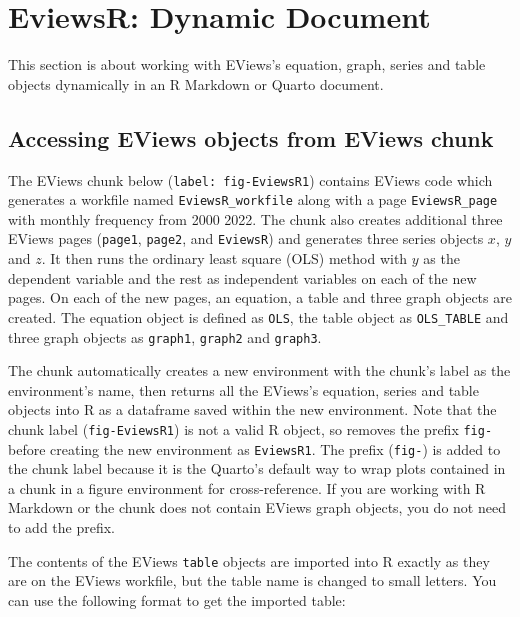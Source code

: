 \hypertarget{sec-dynamic}{%
\section{EviewsR: Dynamic Document}\label{sec-dynamic}}

This section is about working with EViews's equation, graph, series and table objects dynamically in an R Markdown or Quarto document.

\hypertarget{accessing-eviews-objects-from-eviews-chunk}{%
\subsection{Accessing EViews objects from EViews chunk}\label{accessing-eviews-objects-from-eviews-chunk}}

The EViews chunk below (\texttt{label:\ fig-EviewsR1}) contains EViews code which generates a workfile named \texttt{EviewsR\_workfile} along with a page \texttt{EviewsR\_page} with monthly frequency from 2000 2022. The chunk also creates additional three EViews pages (\texttt{page1}, \texttt{page2}, and \texttt{EviewsR}) and generates three series objects \(x\), \(y\) and \(z\). It then runs the ordinary least square (OLS) method with \(y\) as the dependent variable and the rest as independent variables on each of the new pages. On each of the new pages, an equation, a table and three graph objects are created. The equation object is defined as \texttt{OLS}, the table object as \texttt{OLS\_TABLE} and three graph objects as \texttt{graph1}, \texttt{graph2} and \texttt{graph3}.

The chunk automatically creates a new environment with the chunk's label as the environment's name, then returns all the EViews's equation, series and table objects into R as a dataframe saved within the new environment. Note that the chunk label (\texttt{fig-EviewsR1}) is not a valid R object, so  removes the prefix \texttt{fig-} before creating the new environment as \texttt{EviewsR1}. The prefix (\texttt{fig-}) is added to the chunk label because it is the Quarto's default way to wrap plots contained in a chunk in a figure environment for cross-reference. If you are working with R Markdown or the chunk does not contain EViews graph objects, you do not need to add the prefix.

The contents of the EViews \texttt{table} objects are imported into R exactly as they are on the EViews workfile, but the table name is changed to small letters. You can use the following format to get the imported table:

